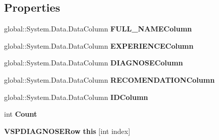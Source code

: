 \subsection*{Properties}
\begin{CompactItemize}
\item 
global::System.Data.DataColumn \textbf{FULL\_\-NAMEColumn}\hspace{0.3cm}{\tt  [get]}\label{class_automatic_medical_system_1_1_data_set1_1_1_v_s_p_d_i_a_g_n_o_s_e_data_table_fac676b6d0a8db323f684cb1f0bbb77a}

\item 
global::System.Data.DataColumn \textbf{EXPERIENCEColumn}\hspace{0.3cm}{\tt  [get]}\label{class_automatic_medical_system_1_1_data_set1_1_1_v_s_p_d_i_a_g_n_o_s_e_data_table_21b5d3586f086097297e716622d4323d}

\item 
global::System.Data.DataColumn \textbf{DIAGNOSEColumn}\hspace{0.3cm}{\tt  [get]}\label{class_automatic_medical_system_1_1_data_set1_1_1_v_s_p_d_i_a_g_n_o_s_e_data_table_07188fa430170031915c07fb84909f7d}

\item 
global::System.Data.DataColumn \textbf{RECOMENDATIONColumn}\hspace{0.3cm}{\tt  [get]}\label{class_automatic_medical_system_1_1_data_set1_1_1_v_s_p_d_i_a_g_n_o_s_e_data_table_5d68a6a9cdea5005fe7ed34db108cc6b}

\item 
global::System.Data.DataColumn \textbf{IDColumn}\hspace{0.3cm}{\tt  [get]}\label{class_automatic_medical_system_1_1_data_set1_1_1_v_s_p_d_i_a_g_n_o_s_e_data_table_a096466cd74a96224f92ee235eb5f3d8}

\item 
int \textbf{Count}\hspace{0.3cm}{\tt  [get]}\label{class_automatic_medical_system_1_1_data_set1_1_1_v_s_p_d_i_a_g_n_o_s_e_data_table_107dc266b2024e0bfaaffb86d69ffd27}

\item 
{\bf VSPDIAGNOSERow} \textbf{this} [int index]\hspace{0.3cm}{\tt  [get]}\label{class_automatic_medical_system_1_1_data_set1_1_1_v_s_p_d_i_a_g_n_o_s_e_data_table_410023ea1067cdcfd0ad4af45868dd88}

\end{CompactItemize}
